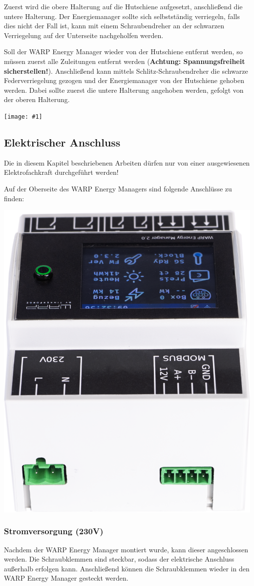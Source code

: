 \documentclass[a4paper,10pt]{article}
\newcommand{\hint}[1]{\begin{tcolorbox}[colback=boxgray,colframe=black,coltext=
white,title=Hinweis,left*=2mm,right*=2mm,boxsep=1mm,bottom=1mm,top=1mm]#1\end{tcolorbox}}
\newcommand{\gfx}[1]{\texttt{[image: \#1]}}
\begin{document}
\begin{multicols*}{2}
	Zuerst wird die obere Halterung auf die Hutschiene aufgesetzt, anschließend
	die untere Halterung. Der Energiemanager sollte sich selbstständig verriegeln, falls dies
	nicht der Fall ist, kann mit einem Schraubendreher an der schwarzen Verriegelung
	auf der Unterseite nachgeholfen werden.

	Soll der WARP Energy Manager wieder von der Hutschiene entfernt werden, so
	müssen zuerst alle Zuleitungen entfernt werden (\textbf{Achtung: Spannungsfreiheit
	sicherstellen!}). Anschließend kann mittels Schlitz-Schraubendreher die schwarze
	Federverriegelung gezogen und der Energiemanager von der Hutschiene
	gehoben werden. Dabei sollte zuerst die untere Halterung angehoben werden,
	gefolgt von der oberen Halterung.

	\gfx{./img_v2/wem2_mounting.jpg}

	\subsection{Elektrischer Anschluss}
	\hint{Die in diesem Kapitel beschriebenen Arbeiten dürfen nur von einer ausgewiesenen
		Elektrofachkraft durchgeführt werden!}

    Auf der Oberseite des WARP Energy Managers sind folgende Anschlüsse zu finden:
	\begin{center}
        \includegraphics[width=0.5\linewidth]{./img_v2/wem2-connections-top.png}
    \end{center}

	\subsubsection{Stromversorgung (230V)}
	Nachdem der WARP Energy Manager montiert wurde, kann dieser angeschlossen werden.
	Die Schraubklemmen sind steckbar, sodass der elektrische Anschluss
	außerhalb erfolgen kann. Anschließend können die Schraubklemmen wieder in
	den WARP Energy Manager gesteckt werden.


\end{multicols*}
\end{document}
